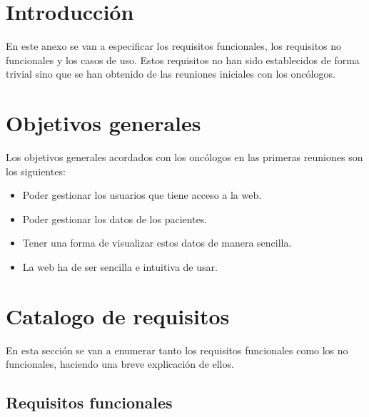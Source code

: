 
\section{Introducción}

En este anexo se van a especificar los requisitos funcionales, los requisitos no funcionales y los casos de uso. Estos requisitos no han sido establecidos de forma trivial sino que se han obtenido de las reuniones iniciales con los oncólogos.

\section{Objetivos generales}

Los objetivos generales acordados con los oncólogos en las primeras reuniones son los siguientes:

\begin{itemize}
    \item Poder gestionar los usuarios que tiene acceso a la web.
    \item Poder gestionar los datos de los pacientes.
	\item Tener una forma de visualizar estos datos de manera sencilla.
	\item La web ha de ser sencilla e intuitiva de usar.
\end{itemize}

\section{Catalogo de requisitos}

En esta sección se van a enumerar tanto los requisitos funcionales como los no funcionales, haciendo una breve explicación de ellos.

\subsection{Requisitos funcionales}

